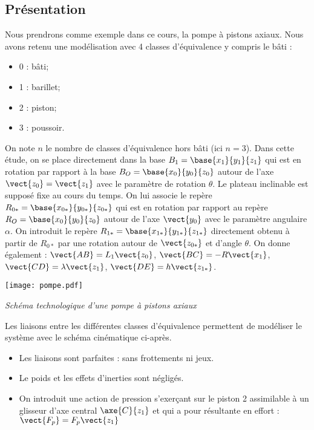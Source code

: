 \ifprof
\begin{multicols}{2}
\else
\begin{multicols}{2}
\fi

\subsection*{Présentation}
Nous prendrons comme exemple dans ce cours, la pompe à pistons axiaux. Nous avons retenu une modélisation avec 4 classes d'équivalence y compris le bâti :

\begin{itemize}
\item 0 : bâti;
\item 1 : barillet;
\item 2 : piston;
\item 3 : poussoir.
\end{itemize}

On note $n$ le nombre de classes d'équivalence hors bâti (ici $n=3$).
Dans cette étude, on se place directement dans la base $B_{1}=\base{{x_{1}}}{{y_{1}}}{{z_{1}}}$ qui est en rotation par rapport à la base $B_{O}=\base{{x_{0}}}{{y_{0}}}{{z_{0}}}$ autour de l'axe $\vect{z_{0}}=\vect{z_{1}}$ avec le paramètre de rotation $\theta$.
Le plateau inclinable est supposé fixe au cours du temps. On lui associe le repère $R_{0*}=\base{{x_{0*}}}{{y_{0*}}}{{z_{0*}}}$ qui est en rotation par rapport au repère $R_{O}=\base{{x_{0}}}{{y_{0}}}{{z_{0}}}$ autour de l'axe $\vect{y_{0}}$ avec le paramètre angulaire $\alpha$. On introduit le repère $R_{1*}=\base{{x_{1*}}}{{y_{1*}}}{{z_{1*}}}$ directement obtenu à partir de $R_{0*}$ par une rotation autour de $\vect{z_{0*}}$ et d'angle $\theta$.
On donne également :
$\vect{AB}=L_1\vect{z_0}$, $\vect{BC}=-R\vect{x_1}$, $\vect{CD}=\lambda\vect{z_1}$, $\vect{DE}=h\vect{z_{1*}}$.


\begin{center}
  \texttt{[image: pompe.pdf]}
  
  \textit{Schéma technologique d'une pompe à pistons axiaux \label{fig:techno_pompe}}

\end{center}


Les liaisons entre les différentes classes d'équivalence permettent de modéliser le système avec le schéma cinématique ci-après.



\begin{itemize}
\item Les liaisons sont parfaites : sans frottements ni jeux.
\item Le poids et les effets d'inerties sont négligés.
\item On introduit une action de pression s'exerçant sur le piston 2 assimilable à un glisseur d'axe central $\axe{C}{{z_1}}$ et qui a pour résultante en effort : $\vect{F_p}=F_p\vect{z_1}$
\end{itemize}



\end{multicols}
\end{multicols}
